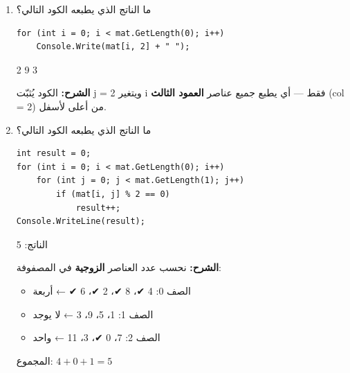 \documentclass[14pt]{extarticle}
\begin{document}
\begin{enumerate}[itemsep=2em]
\ifwithsols
\begin{boxSolution}
\textenglish{4  8  2  6}

\textbf{الشرح:} الكود يُثبّت \textenglish{i = 0} ويتغير \textenglish{j} فقط — أي يطبع جميع عناصر \textbf{الصف الأول} فقط.
\end{boxSolution}
\fi

\item
ما الناتج الذي يطبعه الكود التالي؟

\begin{boxCode}
\begin{english}
\begin{verbatim}
for (int i = 0; i < mat.GetLength(0); i++)
    Console.Write(mat[i, 2] + " ");
\end{verbatim}
\end{english}
\end{boxCode}

\ifwithsols
\begin{boxSolution}
\textenglish{2  9  3}

\textbf{الشرح:} الكود يُثبّت \textenglish{j = 2} ويتغير \textenglish{i} فقط — أي يطبع جميع عناصر \textbf{العمود الثالث} (\textenglish{col = 2}) من أعلى لأسفل.
\end{boxSolution}
\fi
\clearpage

\item
ما الناتج الذي يطبعه الكود التالي؟

\begin{boxCode}
\begin{english}
\begin{verbatim}
int result = 0;
for (int i = 0; i < mat.GetLength(0); i++)
    for (int j = 0; j < mat.GetLength(1); j++)
        if (mat[i, j] % 2 == 0)
            result++;
Console.WriteLine(result);
\end{verbatim}
\end{english}
\end{boxCode}

\ifwithsols
\begin{boxSolution}
الناتج: \textenglish{5}

\textbf{الشرح:} نحسب عدد العناصر \textbf{الزوجية} في المصفوفة:
\begin{itemize}[itemsep=1pt]
    \item الصف 0: 4 ✔، 8 ✔، 2 ✔، 6 ✔ ← أربعة
    \item الصف 1: 1، 5، 9، 3 ← لا يوجد
    \item الصف 2: 7، 0 ✔، 3، 11 ← واحد
\end{itemize}
المجموع: $4 + 0 + 1 = 5$
\end{boxSolution}
\clearpage
\fi



\end{enumerate}
\end{document}
